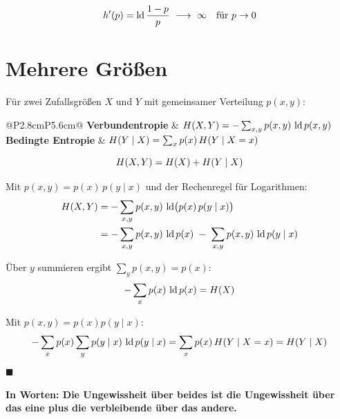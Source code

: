 \begin{merksatz}
\[ h'(p) = \lb\frac{1-p}{p} \ \longrightarrow\ \infty \quad\text{für } p\to0 \]

\begin{center}
\begin{minipage}{0.88\textwidth}
\end{minipage}
\end{center}
\end{merksatz}

\section{Mehrere Größen}

\begin{definition}
Für zwei Zufallsgrößen $X$ und $Y$ mit gemeinsamer Verteilung $p(x,y)$:
\begin{center}
{\small
\renewcommand{\arraystretch}{1.6}
\begin{tabular}{@{}P{2.8cm}P{5.6cm}@{}}
\toprule
\textbf{Verbundentropie} & $H(X,Y) = -\sum_{x,y} p(x,y)\,\operatorname{ld} p(x,y)$\\
\textbf{Bedingte Entropie} & $H(Y\mid X) = \sum_x p(x)\,H(Y\mid X=x)$\\
\bottomrule
\end{tabular}}
\end{center}
\end{definition}

\begin{merksatz}
\[ H(X,Y) = H(X) + H(Y\mid X) \]

Mit $p(x,y) = p(x)\,p(y\mid x)$ und der Rechenregel für Logarithmen:
\begin{align*}
H(X,Y) &= -\sum_{x,y} p(x,y)\,\operatorname{ld}\bigl(p(x)\,p(y\mid x)\bigr)\\
&= -\sum_{x,y} p(x,y)\,\operatorname{ld} p(x) \;-\; \sum_{x,y} p(x,y)\,\operatorname{ld} p(y\mid x)
\end{align*}

 Über $y$ summieren ergibt $\sum_y p(x,y) = p(x)$:
\[ -\sum_x p(x)\,\operatorname{ld} p(x) = H(X) \]

 Mit $p(x,y) = p(x)p(y\mid x)$:
\[ -\sum_x p(x)\sum_y p(y\mid x)\,\operatorname{ld} p(y\mid x) = \sum_x p(x)\,H(Y\mid X=x) = H(Y\mid X) \]
$\blacksquare$

\begin{center}
\begin{minipage}{0.9\textwidth}
\textbf{In Worten: Die Ungewissheit über beides ist die Ungewissheit über das eine plus die verbleibende über das andere.}
\end{minipage}
\end{center}
\end{merksatz}

